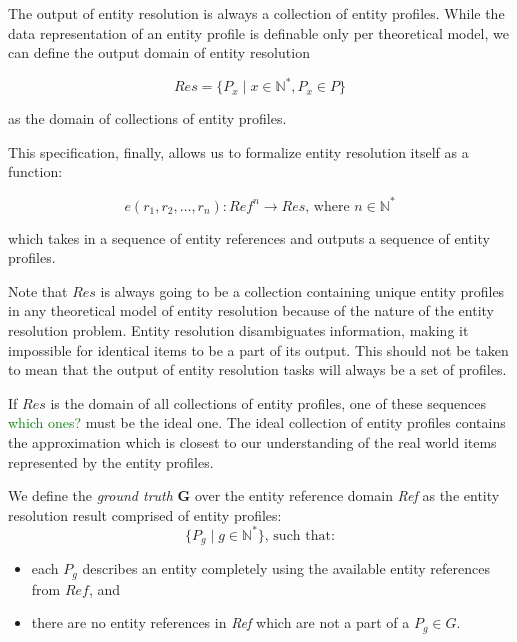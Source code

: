 \documentclass[journal]{IEEEtran}
\begin{document}
    The output of entity resolution is always a collection of entity profiles.
    While the data representation of an entity profile is definable only per
    theoretical model, we can define the output domain of entity resolution

    \[
        Res=\{P_x \mid x \in \mathbb{N^*}, P_x \in P\}
    \]

    \noindent
    as the domain of collections of entity profiles.

    This specification, finally, allows us to formalize entity resolution itself as a function:

    \[
        e(r_1, r_2, \ldots, r_n): Ref^n \rightarrow Res\text{, where }n\in\mathbb{N^*}
    \]
    
    \noindent
    which takes in a sequence of entity references and outputs a sequence of
    entity profiles.

    Note that $Res$ is always going to be a collection containing unique entity
    profiles in any theoretical model of entity resolution because of the nature
    of the entity resolution problem.
    Entity resolution disambiguates information, making it impossible for
    identical items to be a part of its output.
    This should not be taken to mean that the output of entity resolution tasks
    will always be a set of profiles.

    If $Res$ is the domain of all collections of entity profiles, one of
    these sequences 
    \textcolor{green}{which ones?} 
    must be the ideal one.
    The ideal collection of entity profiles contains the approximation which is
    closest to our understanding of the real world items represented by the
    entity profiles.

    \begin{defn}
        We define the \textit{ground truth} \textbf{G} over the entity reference
        domain \textit{Ref} as the entity resolution result comprised of entity
        profiles:
        \[
            \{P_g \mid g \in \mathbb{N^*}\}\textrm{, such that:}
        \]
        \begin{itemize}
            \item each $P_g$ describes an entity completely using the available
            entity references from $Ref$, and
            \item there are no entity references in \textit{Ref} which are not a
            part of a $P_g \in G$.
        \end{itemize}
    \end{defn}
\end{document}
